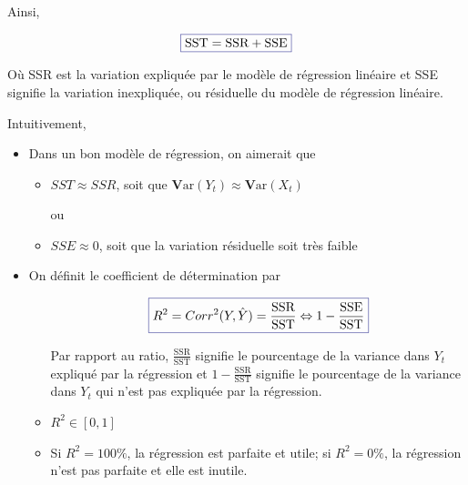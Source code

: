 \documentclass[11pt,french]{report}
\newcommand{\Var}{\mathrm{\textbf{V}ar}}
\begin{document}
Ainsi, 

\begin{equation}
\label{eq:SST}
\color{Blue}
\boxed{\color{black}
\text{SST} = \text{SSR} + \text{SSE}}
\end{equation}


Où SSR est la variation expliquée par le modèle de régression linéaire et SSE signifie la variation inexpliquée, ou résiduelle du modèle de régression linéaire.
\bigskip

Intuitivement, 
\begin{itemize}
     \item Dans un bon modèle de régression, on aimerait que 
          \begin{itemize}
          \item $SST \approx SSR$, soit que $\Var(Y_t) \approx \Var(X_t)$ 
          \item[ou]
          \item $SSE \approx 0$, soit que la variation résiduelle soit très faible
          \end{itemize}
     \item On définit le coefficient de détermination par
          \begin{itemize}
          \item[]\begin{equation}
          \label{eq:R}
          \color{Blue}
          \boxed{\color{black}
          R^2 = Corr^2(Y, \hat{Y}) = \frac{\text{SSR}}{\text{SST}} \Leftrightarrow 1 - \frac{\text{SSE}}{\text{SST}}}
          \end{equation}
          
          Par rapport au ratio, $\frac{\text{SSR}}{\text{SST}}$ signifie le pourcentage de la variance dans $Y_t$ expliqué par la régression et 
          $1 - \frac{\text{SSR}}{\text{SST}}$ signifie le pourcentage de la variance dans $Y_t$ qui n'est pas expliquée par la régression.
          \item $R^2 \in [0,1] $
          \item Si $R^2 = 100 \%$, la régression est parfaite et utile; si $R^2 = 0 \%$, la régression n'est pas parfaite et elle est inutile.
          \end{itemize}
\end{itemize}
\end{document}
